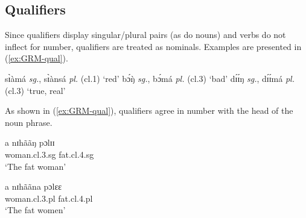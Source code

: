 \subsection{Qualifiers}
\label{sec:GRM-qualifier}




Since qualifiers display singular/plural pairs (as  do nouns) and verbs do
not inflect for number, qualifiers are  treated  as  nominals. Examples are
presented
in (\ref{ex:GRM-qual}).


\begin{exe}
\ex\label{ex:GRM-qual}
 \begin{xlist}
  \ex\label{ex:GRM-qual-red}
sɪ̀àmá {\it sg.}, sɪ̀ànsá {\it pl.}   ({\sc cl.}1) `red'
  \ex\label{ex:GRM-qual-bad}
 bɔ́ŋ̀ {\it sg.}, bɔ́má {\it pl.}  ({\sc cl.}3)  `bad'
  \ex\label{ex:GRM-qual-real}
dɪ́ɪ́ŋ {\it sg.}, dɪ́ɪ́má {\it pl.} ({\sc cl.}3) `true, real' 

  \end{xlist}
\end{exe}


As shown in (\ref{ex:GRM-qual}), qualifiers agree in number with the head of the
noun phrase. 

\begin{exe}
\ex\label{ex:GRM-qual-agree}
 \begin{xlist}
  \ex\label{ex:GRM-qual-agree-sg}

\gll a nɪhããŋ pɔlɪɪ\\
{\art} woman.{\sc cl.3.sg} fat.{\sc cl.4.sg}   \\
\glt `The fat woman'


  \ex\label{ex:GRM-qual-agree-pl}

\gll a nɪhããna pɔlɛɛ\\
{\art} woman.{\sc cl.3.pl} fat.{\sc cl.4.pl}   \\
\glt `The fat women'

  \end{xlist}
\end{exe}


